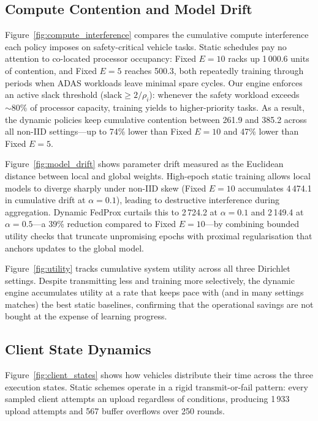 \documentclass[conference]{IEEEtran}
\begin{document}
\subsection{Compute Contention and Model Drift}
Figure~\ref{fig:compute_interference} compares the cumulative compute interference each policy imposes on safety-critical vehicle tasks. Static schedules pay no attention to co-located processor occupancy: Fixed $E{=}10$ racks up 1\,000.6 units of contention, and Fixed $E{=}5$ reaches 500.3, both repeatedly training through periods when ADAS workloads leave minimal spare cycles. Our engine enforces an active slack threshold ($\text{slack} \ge 2/\rho_i$): whenever the safety workload exceeds ${\sim}80$\% of processor capacity, training yields to higher-priority tasks. As a result, the dynamic policies keep cumulative contention between 261.9 and 385.2 across all non-IID settings---up to 74\% lower than Fixed $E{=}10$ and 47\% lower than Fixed $E{=}5$.

Figure~\ref{fig:model_drift} shows parameter drift measured as the Euclidean distance between local and global weights. High-epoch static training allows local models to diverge sharply under non-IID skew (Fixed $E{=}10$ accumulates 4\,474.1 in cumulative drift at $\alpha{=}0.1$), leading to destructive interference during aggregation. Dynamic FedProx curtails this to 2\,724.2 at $\alpha{=}0.1$ and 2\,149.4 at $\alpha{=}0.5$---a 39\% reduction compared to Fixed $E{=}10$---by combining bounded utility checks that truncate unpromising epochs with proximal regularisation that anchors updates to the global model.

Figure~\ref{fig:utility} tracks cumulative system utility across all three Dirichlet settings. Despite transmitting less and training more selectively, the dynamic engine accumulates utility at a rate that keeps pace with (and in many settings matches) the best static baselines, confirming that the operational savings are not bought at the expense of learning progress.

\subsection{Client State Dynamics}
Figure~\ref{fig:client_states} shows how vehicles distribute their time across the three execution states. Static schemes operate in a rigid transmit-or-fail pattern: every sampled client attempts an upload regardless of conditions, producing 1\,933 upload attempts and 567 buffer overflows over 250 rounds.
\end{document}
